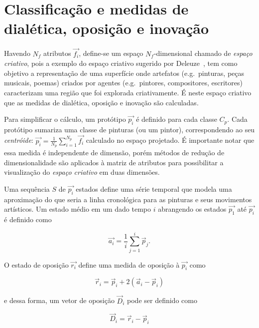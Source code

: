 \section{Classificação e medidas de dialética, oposição e inovação}
\label{sec:medidas}


Havendo $N_f$ atributos $\vec{f_i}$, define-se um espaço
$N_f$-dimensional chamado de \textit{espaço criativo}, pois a exemplo
do espaço criativo sugerido por Deleuze~\cite{deleuze}, tem como
objetivo a representação de uma superfície onde artefatos
(e.g.\ pinturas, peças musicais, poemas) criados por agentes
(e.g.\ pintores, compositores, escritores) caracterizam uma região que
foi explorada criativamente. É neste espaço criativo que as medidas de
dialética, oposição e inovação são calculadas.

Para simplificar o cálculo, um protótipo $\vec{p_i}$ é definido para cada classe
$C_p$. Cada protótipo sumariza uma classe de pinturas (ou um pintor),
correspondendo ao seu \textit{centróide}: $\vec{p_i} = \frac{1}{N_p}
\sum_{i=1}^{N_p} \vec{f_i}$ calculado no espaço projetado. É importante notar
que essa medida é independente de dimensão, porém métodos de redução de
dimensionalidade são aplicados à matriz de atributos para possibilitar a
visualização do \textit{espaço criativo} em duas dimensões.

Uma sequência $S$ de $\vec{p_i}$ estados define uma série temporal que
modela uma aproximação do que seria a linha cronológica para as
pinturas e seus movimentos artísticos. Um estado médio em um dado
tempo $i$ abrangendo os estados $\vec{p_1}$ até $\vec{p_i}$ é definido
como

\begin{equation}
\vec{a_i} = \frac{1}{i}\sum_{j=1}^i\vec{p}_j.
\end{equation}

O estado de oposição $\vec{r_i}$ define uma medida de oposição à $\vec{p_i}$ como

\begin{equation}
\vec{r}_i = \vec{p}_i + 2(\vec{a}_i - \vec{p}_i)
\end{equation}

\noindent e dessa forma, um vetor de oposição $\vec{D}_i$ pode ser definido como

\begin{equation}
\vec{D}_i=\vec{r}_i - \vec{p}_i
\end{equation}


